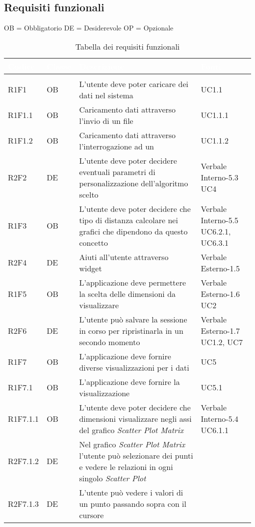 \subsection{Requisiti funzionali}
OB = Obbligatorio \quad DE = Desiderevole \quad OP = Opzionale
\renewcommand{\arraystretch}{1.5}
{
\setlength\arrayrulewidth{1pt}
\begin{longtable}{C{2cm} | C{1.5cm} | C{9cm} | C{3.3cm}}
		\textcolor{white}{\textbf{Codice}} & 
		\textcolor{white}{\textbf{Classe}} & 
		\textcolor{white}{\textbf{Descrizione}} & 
		\textcolor{white}{\textbf{Fonti}} \\
		\endfirsthead
	    \\
	    \endfoot
	    \caption{Tabella dei requisiti funzionali}
	    \endlastfoot

R1F1 & OB & L'utente deve poter caricare dei dati nel sistema & UC1.1\\
R1F1.1 & OB & Caricamento dati attraverso l'invio di un file  & UC1.1.1\\
R1F1.2 & OB & Caricamento dati attraverso l'interrogazione ad un  & UC1.1.2\\

R2F2 & DE & L'utente deve poter decidere eventuali parametri di personalizzazione dell'algoritmo scelto & Verbale Interno-5.3 \newline UC4\\

R1F3 & OB & L'utente deve poter decidere che tipo di distanza calcolare nei grafici che dipendono da questo concetto & Verbale Interno-5.5 \newline UC6.2.1, UC6.3.1\\

R2F4 & DE & Aiuti all'utente attraverso widget & Verbale Esterno-1.5 \\
R1F5 & OB & L'applicazione deve permettere la scelta delle dimensioni da visualizzare & Verbale Esterno-1.6 \newline UC2\\
R2F6 & DE & L'utente può salvare la sessione in corso per ripristinarla in un secondo momento & Verbale Esterno-1.7 \newline UC1.2, UC7\\
R1F7 & OB & L'applicazione deve fornire diverse visualizzazioni per i dati & UC5\\
R1F7.1 & OB & L'applicazione deve fornire la visualizzazione  & UC5.1\\
R1F7.1.1 & OB & L'utente deve poter decidere che dimensioni visualizzare negli assi del grafico \textit{Scatter Plot Matrix} & Verbale Interno-5.4 \newline UC6.1.1\\
R2F7.1.2 & DE & Nel grafico \textit{Scatter Plot Matrix} l'utente può selezionare dei punti e vedere le relazioni in ogni singolo \textit{Scatter Plot} & \\
R2F7.1.3 & DE & L'utente può vedere i valori di un punto passando sopra con il cursore & \\


\end{longtable}}
